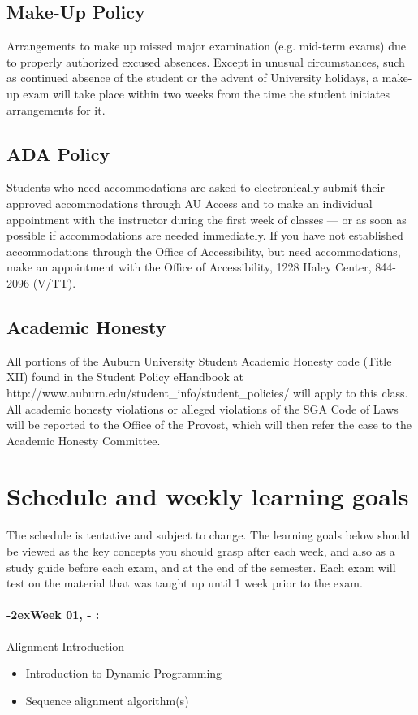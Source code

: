\documentclass[11pt]{article}
\newcommand{\week}[1]{%
  \paragraph*{\kern-2ex\quad #1, \syldate{\today} - \AdvanceDate[4]\syldate{\today}:}%
  \ifdim\wd1=\wd\MONDAY
    \AdvanceDate[7]
  \else
    \AdvanceDate[7]
  \fi%
}
\begin{document}
\subsection{Make-Up Policy}
Arrangements to make up missed major examination (e.g. mid-term exams) due to properly authorized excused absences. Except in unusual circumstances, such as continued absence of the student or the advent of University holidays, a make-up exam will take place within two weeks from the time the student initiates arrangements for it. 
\subsection{ADA Policy}
Students who need accommodations are asked to electronically submit their approved accommodations through AU Access and to make an individual appointment with the instructor during the first week of classes --- or as soon as possible if accommodations are needed immediately. If you have not established accommodations through the Office of Accessibility, but need accommodations, make an appointment with the Office of Accessibility, 1228 Haley Center, 844-2096 (V/TT).
\subsection{Academic Honesty}
All portions of the Auburn University Student Academic Honesty code (Title XII) found in the Student Policy eHandbook at http://www.auburn.edu/student\_info/student\_policies/ will apply to this class. All academic honesty violations or alleged violations of the SGA Code of Laws will be reported to the Office of the Provost, which will then refer the case to the Academic Honesty Committee.


\newpage
\section*{Schedule and weekly learning goals}
The schedule is tentative and subject to change. The learning goals below should be viewed as the key concepts you should grasp after each week, and also as a study guide before each exam, and at the end of the semester. Each exam will test on the material that was taught up until 1 week prior to the exam.
\SetDate[03/01/2022]
\week{Week 01} Alignment Introduction
\begin{itemize}
\item Introduction to Dynamic Programming
\item Sequence alignment algorithm(s)
\end{itemize}
\end{document}
